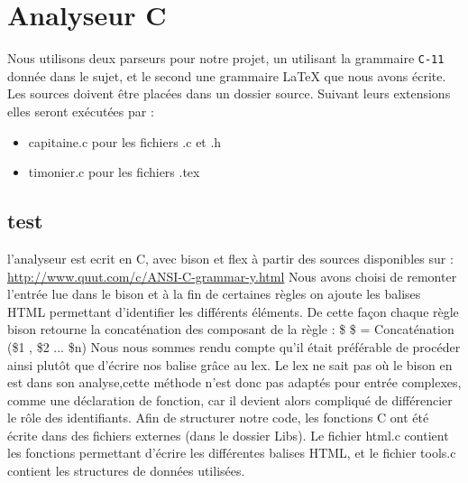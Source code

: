 \documentclass{report}
\begin{document}
\section{Analyseur C}{
Nous utilisons deux parseurs pour notre projet, un utilisant la grammaire \texttt{C-11} donnée dans le sujet, et le second une grammaire LaTeX que nous avons écrite.
	Les sources doivent être placées dans un dossier source. Suivant leurs extensions elles seront exécutées par :
	\begin{itemize}
	\item capitaine.c pour les fichiers .c et .h
	\item timonier.c pour les fichiers .tex
	\end{itemize}
\subsection{test}{
	l'analyseur est ecrit en C, avec bison et flex à partir des sources disponibles sur : \url{http://www.quut.com/c/ANSI-C-grammar-y.html}
	Nous avons choisi de remonter l'entrée lue dans le bison et à la fin de certaines règles on ajoute les balises HTML permettant d'identifier les différents éléments.
	De cette façon chaque règle bison retourne la concaténation des composant de la règle : \$ \$ = Concaténation (\$1 , \$2 ... \$n)
	Nous nous sommes rendu compte qu'il était préférable de procéder ainsi plutôt que d'écrire nos balise grâce au lex. Le lex ne sait pas où le bison en est dans son analyse,cette méthode n'est donc pas adaptés pour entrée complexes, comme une déclaration de fonction, car il devient alors compliqué de différencier le rôle des identifiants.
Afin de structurer notre code, les fonctions C ont été écrite dans des fichiers externes (dans le dossier Libs). Le fichier html.c contient les fonctions permettant d'écrire les différentes balises HTML, et le fichier tools.c contient les structures de données utilisées.
}
}
\end{document}
